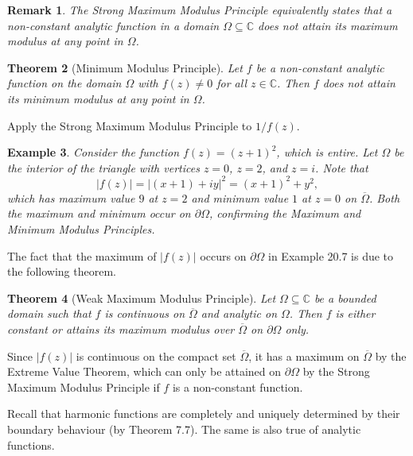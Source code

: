 \documentclass[10pt]{article}
\makeatletter
\newcommand{\C}{\mathbb{C}}
\theoremstyle{newstyle}
\newtheorem{thm}{Theorem}[section]
\newtheorem{remark}[thm]{Remark}
\newtheorem{exmp}[thm]{Example}
\newenvironment{pf}[1][\proofname]{\par
  \pushQED{\qed}%
  \normalfont \topsep0\p@\relax
  \trivlist
  \item[\hskip\labelsep\scshape
  #1\@addpunct{.}]\ignorespaces
}{%
  \popQED\endtrivlist\@endpefalse
}
\makeatother
\begin{document}
\begin{remark}
The Strong Maximum Modulus Principle equivalently states that a non-constant analytic 
function in a domain $\Omega \subseteq \C$ does not attain its maximum modulus at any 
point in $\Omega$. 
\end{remark}

\begin{thm}[Minimum Modulus Principle]
Let $f$ be a non-constant analytic function on the domain $\Omega$ with $f(z) \neq 0$
for all $z \in \C$. Then $f$ does not attain its minimum modulus at any point in $\Omega$. 
\end{thm}
\begin{pf}
Apply the Strong Maximum Modulus Principle to $1/f(z)$. 
\end{pf}

\begin{exmp}
Consider the function $f(z) = (z+1)^2$, which is entire. Let $\Omega$ be the 
interior of the triangle with vertices $z = 0$, $z = 2$, and $z = i$. Note that 
\[ |f(z)| = |(x+1) + iy|^2 = (x+1)^2 + y^2, \]
which has maximum value $9$ at $z = 2$ and minimum value $1$ at $z = 0$ on $\overline\Omega$. 
Both the maximum and minimum occur on $\partial\Omega$, confirming the Maximum and 
Minimum Modulus Principles. 
\end{exmp}

The fact that the maximum of $|f(z)|$ occurs on $\partial\Omega$ in Example 20.7 is due to the following 
theorem. 

\begin{thm}[Weak Maximum Modulus Principle]
Let $\Omega \subseteq \C$ be a bounded domain such that $f$ is continuous on $\overline\Omega$ 
and analytic on $\Omega$. Then $f$ is either constant or attains its maximum modulus over 
$\overline\Omega$ on $\partial\Omega$ only. 
\end{thm}
\begin{pf}
Since $|f(z)|$ is continuous on the compact set $\overline\Omega$, it has a maximum on 
$\overline\Omega$ by the Extreme Value Theorem, which can only be attained on $\partial\Omega$
by the Strong Maximum Modulus Principle if $f$ is a non-constant function. 
\end{pf}

Recall that harmonic functions are completely and uniquely determined by their boundary behaviour 
(by Theorem 7.7). The same is also true of analytic functions. 
\end{document}
